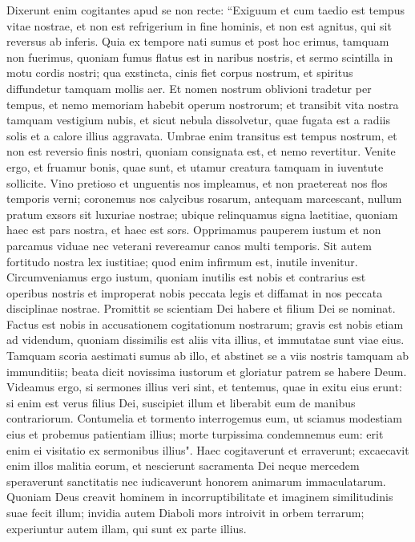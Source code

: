 \begin{biblechapter}  
\verse Dixerunt enim cogitantes apud se non recte: “Exiguum et cum taedio est tempus vitae nostrae, et non est refrigerium in fine hominis, et non est agnitus, qui sit reversus ab inferis. 
\verse Quia ex tempore nati sumus et post hoc erimus, tamquam non fuerimus, quoniam fumus flatus est in naribus nostris, et sermo scintilla in motu cordis nostri; 
\verse qua exstincta, cinis fiet corpus nostrum, et spiritus diffundetur tamquam mollis aer. 
\verse Et nomen nostrum oblivioni tradetur per tempus, et nemo memoriam habebit operum nostrorum; et transibit vita nostra tamquam vestigium nubis, et sicut nebula dissolvetur, quae fugata est a radiis solis et a calore illius aggravata. 
\verse Umbrae enim transitus est tempus nostrum, et non est reversio finis nostri, quoniam consignata est, et nemo revertitur. 
\verse Venite ergo, et fruamur bonis, quae sunt, et utamur creatura tamquam in iuventute sollicite. 
\verse Vino pretioso et unguentis nos impleamus, et non praetereat nos flos temporis verni; 
\verse coronemus nos calycibus rosarum, antequam marcescant, 
\verse nullum pratum exsors sit luxuriae nostrae; ubique relinquamus signa laetitiae, quoniam haec est pars nostra, et haec est sors. 
\verse Opprimamus pauperem iustum et non parcamus viduae nec veterani revereamur canos multi temporis. 
\verse Sit autem fortitudo nostra lex iustitiae; quod enim infirmum est, inutile invenitur. 
\verse Circumveniamus ergo iustum, quoniam inutilis est nobis et contrarius est operibus nostris et improperat nobis peccata legis et diffamat in nos peccata disciplinae nostrae. 
\verse Promittit se scientiam Dei habere et filium Dei se nominat. 
\verse Factus est nobis in accusationem cogitationum nostrarum; gravis est nobis etiam ad videndum, 
\verse quoniam dissimilis est aliis vita illius, et immutatae sunt viae eius. 
\verse Tamquam scoria aestimati sumus ab illo, et abstinet se a viis nostris tamquam ab immunditiis; beata dicit novissima iustorum et gloriatur patrem se habere Deum. 
\verse Videamus ergo, si sermones illius veri sint, et tentemus, quae in exitu eius erunt: 
\verse si enim est verus filius Dei, suscipiet illum et liberabit eum de manibus contrariorum. 
\verse Contumelia et tormento interrogemus eum, ut sciamus modestiam eius et probemus patientiam illius; 
\verse morte turpissima condemnemus eum: erit enim ei visitatio ex sermonibus illius". 
\verse Haec cogitaverunt et erraverunt; excaecavit enim illos malitia eorum, 
\verse et nescierunt sacramenta Dei neque mercedem speraverunt sanctitatis nec iudicaverunt honorem animarum immaculatarum. 
\verse Quoniam Deus creavit hominem in incorruptibilitate et imaginem similitudinis suae fecit illum; 
\verse invidia autem Diaboli mors introivit in orbem terrarum; experiuntur autem illam, qui sunt ex parte illius. 
\end{biblechapter}

